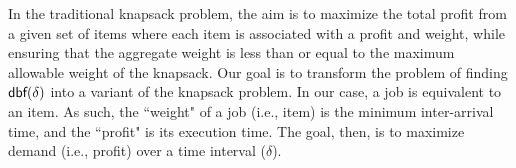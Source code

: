 
In the traditional knapsack problem, the aim is to maximize the total profit from a given set of items where each item is associated with a profit and weight, while ensuring that the aggregate weight is less than or equal to the maximum allowable weight of the knapsack.
Our goal is to transform the problem of finding $\mbox{\sf dbf}(\delta)$ into a variant of the knapsack problem.
In our case, a job is equivalent to an item.
As such, the ``weight" of a job (i.e., item) is the minimum inter-arrival time, and the ``profit" is its execution time.
The goal, then, is to maximize demand (i.e., profit) over a time interval ($\delta$).

